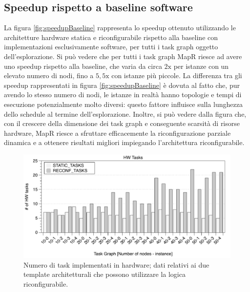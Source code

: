 \subsection{Speedup rispetto a baseline software}
La figura \ref{fig:speedupBaseline} rappresenta lo speedup ottenuto utilizzando
le architetture hardware statica e riconfigurabile rispetto alla baseline
con implementazioni esclusivamente software, per tutti i task graph oggetto
dell'esplorazione. Si pu\`o vedere che per tutti i task graph MapR riesce ad
avere uno speedup rispetto alla baseline, che varia da circa $2\text{x}$ per istanze con
un elevato numero di nodi, fino a $5,5\text{x}$ con istanze pi\`u piccole. La differenza
tra gli speedup rappresentati in figura \ref{fig:speedupBaseline} \`e dovuta al fatto che,
pur avendo lo stesso numero di nodi, le istanze in realt\`a hanno topologie e tempi di
esecuzione potenzialmente molto diversi: questo fattore influisce sulla lunghezza dello schedule
al termine dell'esplorazione.
Inoltre, si pu\`o vedere dalla figura che, con il crescere della dimensione dei task graph e
conseguente scarsit\`a di risorse hardware, MapR riesce a sfruttare efficacemente la riconfigurazione
parziale dinamica e a ottenere risultati migliori impiegando l'architettura riconfigurabile.

\begin{figure}[t]
 \begin{center}
  \includegraphics[width=\textwidth]{./capitoli/figure/cap6/FPL_HWtasks.pdf}
  \caption[Numero di task implementati in hardware.]{Numero di task implementati in hardware; dati relativi ai due template architetturali
  che possono utilizzare la logica riconfigurabile.}
  \label{fig:hardwareTask}
 \end{center}
\end{figure}


